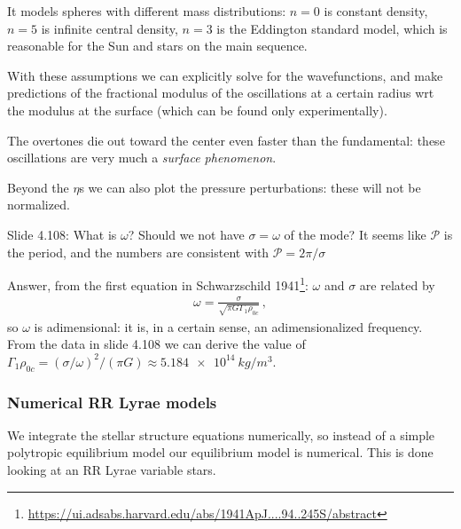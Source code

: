 \documentclass[main.tex]{subfiles}
\begin{document}
It models spheres with different mass distributions:
\(n=0\) is constant density, \(n=5\) is infinite central density, \(n=3\) is the Eddington standard model, which is reasonable for the Sun and stars on the main sequence.

With these assumptions we can explicitly solve for the wavefunctions, and make predictions of the fractional modulus of the oscillations at a certain radius wrt the modulus at the surface (which can be found only experimentally).

The overtones die out toward the center even faster than the fundamental: these oscillations are very much a \emph{surface phenomenon}.

Beyond the \(\eta\)s we can also plot the pressure perturbations: these will not be normalized.

\begin{bluebox}
Slide 4.108: What is \(\omega \)? Should we not have \(\sigma = \omega \) of the mode? It seems like \(\mathcal{P}\) is the period, and the numbers are consistent with \(\mathcal{P} = 2 \pi / \sigma \)

Answer, from the first equation in Schwarzschild 1941\footnote{\url{https://ui.adsabs.harvard.edu/abs/1941ApJ....94..245S/abstract}}: \(\omega \) and \(\sigma \) are related by 
%
\begin{align}
  \omega = \frac{\sigma}{\sqrt{\pi G \Gamma_1 \rho_{0c}}}
  \,,
\end{align}
%
so \(\omega \) is adimensional: it is, in a certain sense, an adimensionalized frequency. From the data in slide 4.108 we can derive the value of \(\Gamma_1 \rho_{0c} = (\sigma / \omega )^2 / (\pi G) \approx \SI{5.184e14}{kg/m^3}\).
\end{bluebox}

\subsubsection{Numerical RR Lyrae models}

We integrate the stellar structure equations numerically, so instead of a simple polytropic equilibrium model our equilibrium model is numerical. 
This is done looking at an RR Lyrae variable stars.
\end{document}
